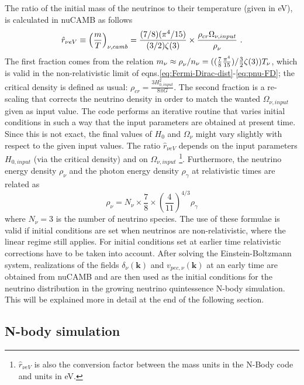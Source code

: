 The ratio of the initial mass of the neutrinos to their temperature
(given in eV), is calculated in nuCAMB as follows 
\begin{equation}
\hat{r}_{\nu eV}\equiv\left(\frac{m}{T}\right)_{\nu,camb}=\frac{(7/8)(\pi^{4}/15)}{(3/2)\zeta(3)}\times\frac{\rho_{cr}\Omega_{\nu,input}}{\text{\ensuremath{\rho}}_{\nu}}\,\,.
\end{equation}
The first fraction comes from the relation $m_{\nu}\approx\text{\ensuremath{\rho}}_{\nu}/n_{\nu}=((\frac{7}{8}\frac{\pi^{4}}{15})/\frac{3}{2}\zeta(3))T_{\nu}$,
which is valid in the non-relativistic limit of eqns.\ref{eq:Fermi-Dirac-dist}-\ref{eq:pnu-FD};
the critical density is defined as usual: $\rho_{cr}=\frac{3H_{0,input}^{2}}{8\pi G}$.
The second fraction is a re-scaling that corrects the neutrino density
in order to match the wanted $\Omega_{\nu,input}$ given as input
value. The code performs an iterative routine that varies initial
conditions in such a way that the input parameters are obtained at
present time. Since this is not exact, the final values of $H_{0}$
and $\Omega_{\nu}$ might vary slightly with respect to the given
input values. The ratio $\hat{r}_{\nu eV}$ depends on the input parameters
$H_{0,input}$ (via the critical density) and on $\Omega_{\nu,input}$
\footnote{$\hat{r}_{\nu eV}$ is also the conversion factor between the mass
units in the N-Body code and units in eV.%
}. Furthermore, the neutrino energy density $\rho_{\nu}$ and the photon
energy density $\rho_{\gamma}$ at relativistic times are related
as 
\begin{equation}
\rho_{\nu}=N_{\nu}\times\frac{7}{8}\times\left(\frac{4}{11}\right)^{4/3}\rho_{\gamma}
\end{equation}
where $N_{\nu}=3$ is the number of neutrino species. The use of these
formulae is valid if initial conditions are set when neutrinos are
non-relativistic, where the linear regime still applies. For initial
conditions set at earlier time relativistic corrections have to be
taken into account. After solving the Einstein-Boltzmann system, realizations
of the fields $\delta_{\nu}(\mathbf{k})$ and $v_{pec,\nu}(\mathbf{k})$
at an early time are obtained from nuCAMB and are then used as the
initial conditions for the neutrino distribution in the growing neutrino
quintessence N-body simulation. This will be explained more in detail
at the end of the following section.


\subsection{N-body simulation\label{sub:GNQ-N-body-simulation}}

